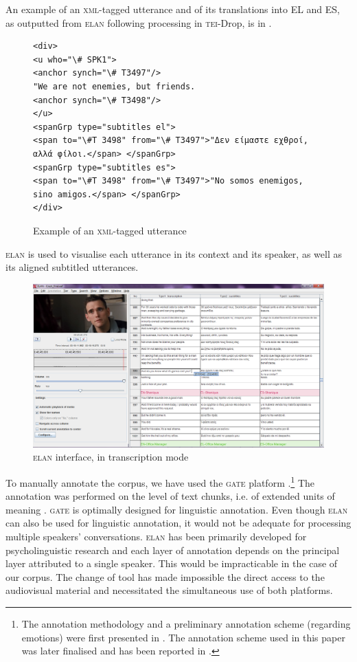 \documentclass[output=paper]{LSP/langsci}
\begin{document}
An example of an \textsc{xml}-tagged utterance and of its translations into EL and ES, as outputted from \textsc{elan} following processing in \textsc{tei}-Drop, is in .

\begin{figure}
\caption{Example of an \textsc{xml}-tagged utterance} \label{fig:2:2}
\begin{lstlisting}
<div>
<u who="\# SPK1">
<anchor synch="\# T3497"/>
"We are not enemies, but friends.
<anchor synch="\# T3498"/>
</u>
<spanGrp type="subtitles el">
<span to="\#T 3498" from="\# T3497">"Δεν είμαστε εχθροί, αλλά φίλοι.</span> </spanGrp>
<spanGrp type="subtitles es">
<span to="\#T 3498" from="\# T3497">"No somos enemigos, sino amigos.</span> </spanGrp>
</div>
\end{lstlisting}
\end{figure}


\textsc{elan} is used to visualise each utterance in its context and its speaker, as well as its aligned subtitled utterances.

\begin{figure}
\includegraphics[width=1.0\textwidth]{./figures/4-2.png}
\caption{\textsc{elan} interface, in transcription mode}
\end{figure}

To manually annotate the corpus, we have used the \textsc{gate} platform \citep{Cunningham2002}.\footnote{The annotation methodology and a preliminary annotation scheme (regarding emotions) were first presented in \citet{Mouka2012}. The annotation scheme used in this paper was later finalised and has been reported in \citet{Mouka2014}.} The annotation was performed on the level of text chunks, i.e. of extended units of meaning \citep{Sinclair1996a}. \textsc{gate} is optimally designed for linguistic annotation. Even though \textsc{elan} can also be used for linguistic annotation, it would not be adequate for processing multiple speakers' conversations. \textsc{elan} has been primarily developed for psycholinguistic research and each layer of annotation depends on the principal layer attributed to a single speaker. This would be impracticable in the case of our corpus. The change of tool has made impossible the direct access to the audiovisual material and necessitated the simultaneous use of both platforms.
\end{document}
